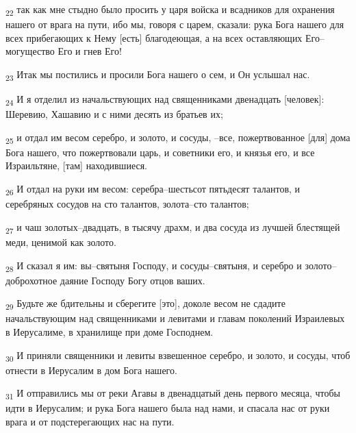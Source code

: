 \begin{tcolorbox}
\textsubscript{22} так как мне стыдно было просить у царя войска и всадников для охранения нашего от врага на пути, ибо мы, говоря с царем, сказали: рука Бога нашего для всех прибегающих к Нему [есть] благодеющая, а на всех оставляющих Его--могущество Его и гнев Его!
\end{tcolorbox}
\begin{tcolorbox}
\textsubscript{23} Итак мы постились и просили Бога нашего о сем, и Он услышал нас.
\end{tcolorbox}
\begin{tcolorbox}
\textsubscript{24} И я отделил из начальствующих над священниками двенадцать [человек]: Шеревию, Хашавию и с ними десять из братьев их;
\end{tcolorbox}
\begin{tcolorbox}
\textsubscript{25} и отдал им весом серебро, и золото, и сосуды, --все, пожертвованное [для] дома Бога нашего, что пожертвовали царь, и советники его, и князья его, и все Израильтяне, [там] находившиеся.
\end{tcolorbox}
\begin{tcolorbox}
\textsubscript{26} И отдал на руки им весом: серебра--шестьсот пятьдесят талантов, и серебряных сосудов на сто талантов, золота--сто талантов;
\end{tcolorbox}
\begin{tcolorbox}
\textsubscript{27} и чаш золотых--двадцать, в тысячу драхм, и два сосуда из лучшей блестящей меди, ценимой как золото.
\end{tcolorbox}
\begin{tcolorbox}
\textsubscript{28} И сказал я им: вы--святыня Господу, и сосуды--святыня, и серебро и золото--доброхотное даяние Господу Богу отцов ваших.
\end{tcolorbox}
\begin{tcolorbox}
\textsubscript{29} Будьте же бдительны и сберегите [это], доколе весом не сдадите начальствующим над священниками и левитами и главам поколений Израилевых в Иерусалиме, в хранилище при доме Господнем.
\end{tcolorbox}
\begin{tcolorbox}
\textsubscript{30} И приняли священники и левиты взвешенное серебро, и золото, и сосуды, чтоб отнести в Иерусалим в дом Бога нашего.
\end{tcolorbox}
\begin{tcolorbox}
\textsubscript{31} И отправились мы от реки Агавы в двенадцатый день первого месяца, чтобы идти в Иерусалим; и рука Бога нашего была над нами, и спасала нас от руки врага и от подстерегающих нас на пути.
\end{tcolorbox}
